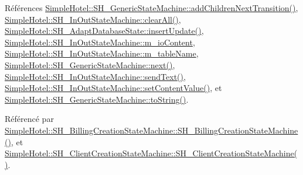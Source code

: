Références \hyperlink{classSimpleHotel_1_1SH__GenericStateMachine_a3771c91002bec6ab9414703251cc7825}{Simple\-Hotel\-::\-S\-H\-\_\-\-Generic\-State\-Machine\-::add\-Children\-Next\-Transition()}, \hyperlink{classSimpleHotel_1_1SH__InOutStateMachine_a2b6d60f624ba23c8fc3e52f73e867c86}{Simple\-Hotel\-::\-S\-H\-\_\-\-In\-Out\-State\-Machine\-::clear\-All()}, \hyperlink{classSimpleHotel_1_1SH__AdaptDatabaseState_af125e11b83df08b8e67f90c55c69d583}{Simple\-Hotel\-::\-S\-H\-\_\-\-Adapt\-Database\-State\-::insert\-Update()}, \hyperlink{classSimpleHotel_1_1SH__InOutStateMachine_a4b0a3a48b0da31fddb724a357ad9b52c}{Simple\-Hotel\-::\-S\-H\-\_\-\-In\-Out\-State\-Machine\-::m\-\_\-io\-Content}, \hyperlink{classSimpleHotel_1_1SH__InOutStateMachine_a15c063debdaa4c87bd4925867a13ce9e}{Simple\-Hotel\-::\-S\-H\-\_\-\-In\-Out\-State\-Machine\-::m\-\_\-table\-Name}, \hyperlink{classSimpleHotel_1_1SH__GenericStateMachine_a2de14d4920ae8c10b70c2d73fc2d4a93}{Simple\-Hotel\-::\-S\-H\-\_\-\-Generic\-State\-Machine\-::next()}, \hyperlink{classSimpleHotel_1_1SH__InOutStateMachine_ae81d4a51fcd3277ebfc11af978b74c0b}{Simple\-Hotel\-::\-S\-H\-\_\-\-In\-Out\-State\-Machine\-::send\-Text()}, \hyperlink{classSimpleHotel_1_1SH__InOutStateMachine_aaf92da452f6cf7cc57aa9e60f88322e4}{Simple\-Hotel\-::\-S\-H\-\_\-\-In\-Out\-State\-Machine\-::set\-Content\-Value()}, et \hyperlink{classSimpleHotel_1_1SH__GenericStateMachine_ad6dd1d0986c40684410ed94f1f610b12}{Simple\-Hotel\-::\-S\-H\-\_\-\-Generic\-State\-Machine\-::to\-String()}.



Référencé par \hyperlink{classSimpleHotel_1_1SH__BillingCreationStateMachine_a8c7d39e11d0ced1fd9c27a5550465b86}{Simple\-Hotel\-::\-S\-H\-\_\-\-Billing\-Creation\-State\-Machine\-::\-S\-H\-\_\-\-Billing\-Creation\-State\-Machine()}, et \hyperlink{classSimpleHotel_1_1SH__ClientCreationStateMachine_a301eb77d9ad72102d5fa8952980cf8a3}{Simple\-Hotel\-::\-S\-H\-\_\-\-Client\-Creation\-State\-Machine\-::\-S\-H\-\_\-\-Client\-Creation\-State\-Machine()}.


